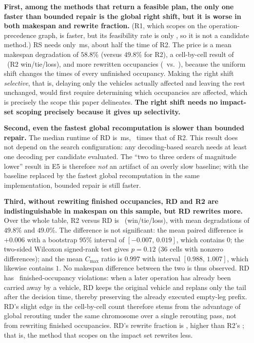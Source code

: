 \textbf{First, among the methods that return a feasible plan, the only one faster than bounded repair is the global right shift,
but it is worse in both makespan and rewrite fraction.} (R1, which scopes on the operation-precedence graph, is faster, but its feasibility rate is only \FeasRone,
so it is not a candidate method.)
RS needs only \MsShift\,ms, about half the time of R2. The price is a mean makespan degradation of \(58.8\%\) (versus
\(49.8\%\) for R2), a cell-by-cell result of \WinVsShift\ (R2 win/tie/loss), and more rewritten occupancies
(\ResFracShift\ vs.\ \ResFracCheapRtwo), because the uniform shift changes the times of every unfinished occupancy.
Making the right shift \emph{selective}, that is, delaying only the vehicles actually affected and leaving the rest unchanged, would first require
determining which occupancies are affected, which is precisely the scope this paper delineates. \textbf{The right shift needs no impact-set scoping precisely because
it gives up selectivity.}

\textbf{Second, even the fastest global recomputation is slower than bounded repair.} The median runtime of RD is
\MsRedecode\,ms, \RedecodeRatio\ times that of R2. This result does not depend on the search configuration: any decoding-based search
needs at least one decoding per candidate evaluated. The ``two to three orders of magnitude lower'' result in E5 is therefore \emph{not}
an artifact of an overly slow baseline; with the baseline replaced by the fastest global recomputation in the same implementation, bounded repair is still faster.

\textbf{Third, without rewriting finished occupancies, RD and R2 are indistinguishable in makespan on this sample, but RD rewrites more.}
Over the whole table, R2 versus RD is \WinVsRedecode\ (win/tie/loss), with mean degradations of \(49.8\%\) and \(49.0\%\). The difference is not significant:
the mean paired difference is \(+0.006\) with a bootstrap \(95\%\) interval of \([-0.007,\,0.019]\), which contains \(0\); the two-sided Wilcoxon signed-rank test
gives \(p=0.12\) (\(36\) cells with nonzero differences); and the mean \(C_{\max}\) ratio is \(0.997\) with interval \([0.988,\,1.007]\), which likewise contains \(1\).
No makespan difference between the two is thus observed.
RD has \RedecodeBad\ finished-occupancy violations: when a later operation has already been carried away by a vehicle, RD keeps the original vehicle and replans only the tail after the decision time,
thereby preserving the already executed empty-leg prefix. RD's slight edge in the cell-by-cell count therefore stems from the advantage of global rerouting under the same chromosome over a single rerouting pass,
not from rewriting finished occupancies. RD's rewrite fraction is \ResFracRedecode, higher than R2's
\ResFracCheapRtwo; that is, the method that scopes on the impact set rewrites less.

